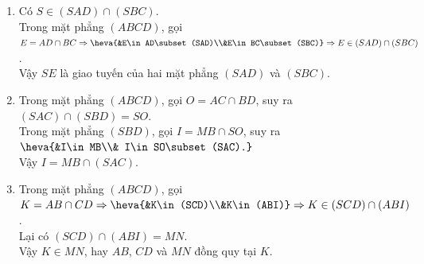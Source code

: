\begin{bt}
\begin{bt}
{\begin{center}
		\end{center}
		\begin{enumerate}
			\item Có $S\in (SAD)\cap (SBC)$.\\
			Trong mặt phẳng $(ABCD)$, gọi $E=AD\cap BC\Rightarrow \heva{&E\in AD\subset (SAD)\\&E\in BC\subset (SBC)}\Rightarrow E\in (SAD)\cap (SBC)$.\\
			Vậy $SE$ là giao tuyến của hai mặt phẳng $(SAD)$ và $(SBC)$. 
			\item Trong mặt phẳng $(ABCD)$, gọi $O=AC\cap BD$, suy ra $(SAC)\cap (SBD)=SO$.\\
			Trong mặt phẳng $(SBD)$, gọi $I=MB\cap SO$, suy ra $\heva{&I\in MB\\& I\in SO\subset (SAC).}$\\ Vậy $I=MB\cap (SAC)$.
			\item Trong mặt phẳng $(ABCD)$, gọi $K=AB\cap CD\Rightarrow \heva{&K\in (SCD)\\&K\in (ABI)}\Rightarrow K\in (SCD)\cap (ABI)$.\\
			Lại có $(SCD)\cap (ABI)=MN$.\\
			Vậy $K\in MN$, hay $AB$, $CD$ và $MN$ đồng quy tại $K$.
		\end{enumerate}
	}
\end{bt}


\end{bt}
